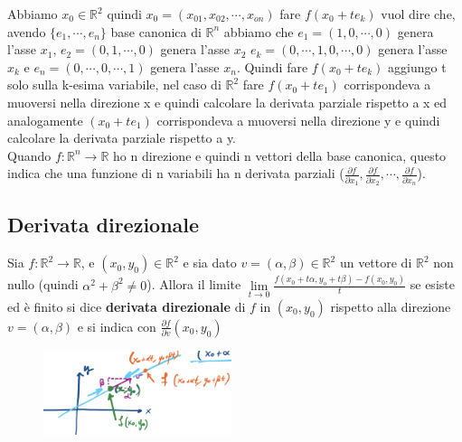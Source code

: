 \begin{observation}
Abbiamo $x_0 \in \mathbb{R}^2$ quindi $x_0 = (x_{01}, x_{02}, \cdots, x_{on})$ fare $f(x_0 + te_k)$ vuol dire che, avendo $\{e_1, \cdots, e_n\}$ base canonica di $\mathbb{R}^n$ abbiamo che $e_1 = (1,0, \cdots, 0)$ genera l'asse $x_1$, $e_2 = (0,1,\cdots, 0)$ genera l'asse $x_2$ $e_k = (0,\cdots, 1, 0, \cdots, 0)$ genera l'asse $x_k$ e $e_n = (0,\cdots, 0,\cdots, 1)$ genera l'asse $x_n$. Quindi fare $f(x_0 + te_k)$ aggiungo t solo sulla k-esima variabile, nel caso di $\mathbb{R}^2$ fare $f(x_0+te_1)$ corrispondeva a muoversi nella direzione x e quindi calcolare la derivata parziale rispetto a x ed analogamente $(x_0+te_1)$ corrispondeva a muoversi nella direzione y e quindi calcolare la derivata parziale rispetto a y.\\
Quando $f: \mathbb{R}^n \to \mathbb{R}$ ho n direzione e quindi n vettori della base canonica, questo indica che una funzione di n variabili ha n derivata parziali ($\frac{\partial f}{\partial x_1}, \frac{\partial f}{\partial x_2}, \cdots, \frac{\partial f}{\partial x_n}$).
\end{observation}

\subsection{Derivata direzionale}
\begin{definition}
Sia $f: \mathbb{R}^2 \to \mathbb{R}$, e $(x_0,y_0) \in \mathbb{R}^2$ e sia dato $v = (\alpha, \beta) \in \mathbb{R}^2$ un vettore di $\mathbb{R}^2$ non nullo (quindi $\alpha^2 + \beta^2 \neq 0$). Allora il limite $\lim\limits_{t \to 0}\frac{f(x_0 + t\alpha, y_o + t\beta) - f(x_0,y_0)}{t}$ se esiste ed è finito si dice \textbf{derivata direzionale} di $f$ in $(x_0, y_0)$ rispetto alla direzione $v = (\alpha, \beta)$ e si indica con $\frac{\partial f}{\partial v}(x_0,y_0)$
\end{definition}

\begin{figure}
    \vspace{-10pt}
    \centering
    \includegraphics[width=5.5cm]{images/deri-direzionale.png}
\end{figure}

